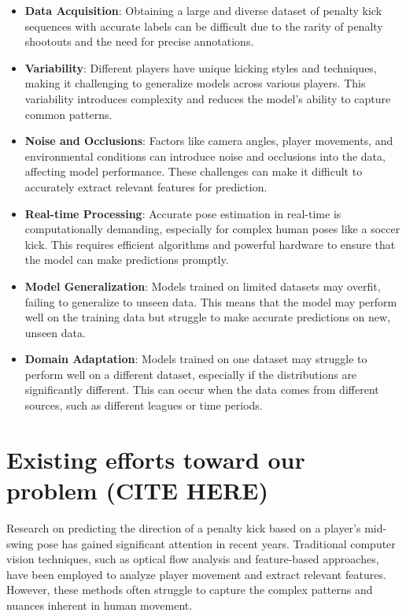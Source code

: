 \documentclass{article}
\begin{document}
\begin{itemize}
    \item {\bf Data Acquisition}: Obtaining a large and diverse dataset of penalty kick sequences with accurate labels can be difficult due to the rarity of penalty shootouts and the need for precise annotations.
    \item {\bf Variability}: Different players have unique kicking styles and techniques, making it challenging to generalize models across various players. This variability introduces complexity and reduces the model's ability to capture common patterns.
    \item {\bf Noise and Occlusions}: Factors like camera angles, player movements, and environmental conditions can introduce noise and occlusions into the data, affecting model performance. These challenges can make it difficult to accurately extract relevant features for prediction.
    \item {\bf Real-time Processing}: Accurate pose estimation in real-time is computationally demanding, especially for complex human poses like a soccer kick. This requires efficient algorithms and powerful hardware to ensure that the model can make predictions promptly.
    \item {\bf Model Generalization}: Models trained on limited datasets may overfit, failing to generalize to unseen data. This means that the model may perform well on the training data but struggle to make accurate predictions on new, unseen data.
    \item {\bf Domain Adaptation}: Models trained on one dataset may struggle to perform well on a different dataset, especially if the distributions are significantly different. This can occur when the data comes from different sources, such as different leagues or time periods.
\end{itemize}






\section{Existing efforts toward our problem (CITE HERE)}

Research on predicting the direction of a penalty kick based on a player's mid-swing pose has gained significant attention in recent years. Traditional computer vision techniques, such as optical flow analysis and feature-based approaches, have been employed to analyze player movement and extract relevant features. However, these methods often struggle to capture the complex patterns and nuances inherent in human movement.
\end{document}
